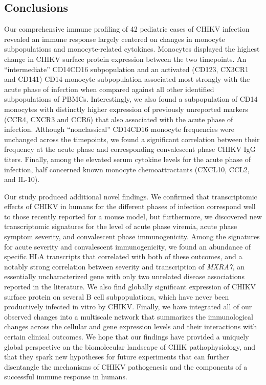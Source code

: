 \subsection{Conclusions}

Our comprehensive immune profiling of 42 pediatric cases of CHIKV infection revealed an immune response largely centered on changes in monocyte subpopulations and monocyte-related cytokines. Monocytes displayed the highest change in CHIKV surface protein expression between the two timepoints. An “intermediate” CD14\sups{++}\allowbreak CD16\sups{+} subpopulation and an activated (CD123\sups{+}, CX3CR1\sups{+} and CD141\sups{+}) CD14\sups{+} monocyte subpopulation associated most strong\-ly with the acute phase of infection when compared against all other identified subpopulations of PBMCs. Interestingly, we also found a subpopulation of CD14\sups{+} monocytes with distinctly higher expression of previously unreported markers (CCR4, CXCR3 and CCR6) that also associated with the acute phase of infection. Although “nonclassical” CD14\sups{+}\allowbreak CD16\sups{++} monocyte frequencies were unchanged across the timepoints, we found a significant correlation between their frequency at the acute phase and corresponding convalescent phase CHIKV IgG titers. Finally, among the elevated serum cytokine levels for the acute phase of infection, half concerned known monocyte chemoattractants (CXCL10, CCL2, and IL-10).

Our study produced additional novel findings. We confirmed that transcriptomic effects of CHIKV in humans for the different phases of infection correspond well to those recently reported for a mouse model,\autocite{Wilson2017} but furthermore, we discovered new transcriptomic signatures for the level of acute phase viremia, acute phase symptom severity, and convalescent phase immunogenicity. Among the signatures for acute severity and convalescent immunogenicity, we found an abundance of specific HLA transcripts that correlated with both of these outcomes, and a notably strong correlation between severity and transcription of \emph{MXRA7}, an essentially uncharacterized gene with only two unrelated disease associations reported in the literature.\autocite{Sim2013,Veiga-Castelli2010} We also find globally significant expression of CHIKV surface protein on several B cell subpopulations, which have never been productively infected in vitro by CHIKV.\autocite{Her2010,Sourisseau2007,Teng2012a} Finally, we have integrated all of our observed changes into a multiscale network that summarizes the immunological changes across the cellular and gene expression levels and their interactions with certain clinical outcomes. We hope that our findings have provided a uniquely global perspective on the biomolecular landscape of CHIK pathophysiology, and that they spark new hypotheses for future experiments that can further disentangle the mechanisms of CHIKV pathogenesis and the components of a successful immune response in humans.

